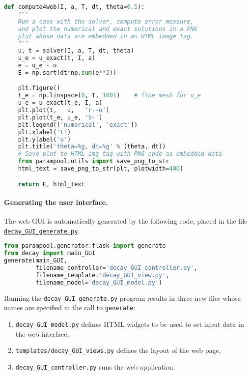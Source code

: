 \documentclass[graybox,sectrefs,envcountresetchap,open=right,final]{svmonodo}
\begin{document}
\begin{lstlisting}[language=python,style=blue1_bluegreen]
def compute4web(I, a, T, dt, theta=0.5):
    """
    Run a case with the solver, compute error measure,
    and plot the numerical and exact solutions in a PNG
    plot whose data are embedded in an HTML image tag.
    """
    u, t = solver(I, a, T, dt, theta)
    u_e = u_exact(t, I, a)
    e = u_e - u
    E = np.sqrt(dt*np.sum(e**2))

    plt.figure()
    t_e = np.linspace(0, T, 1001)    # fine mesh for u_e
    u_e = u_exact(t_e, I, a)
    plt.plot(t,   u,   'r--o')
    plt.plot(t_e, u_e, 'b-')
    plt.legend(['numerical', 'exact'])
    plt.xlabel('t')
    plt.ylabel('u')
    plt.title('theta=%g, dt=%g' % (theta, dt))
    # Save plot to HTML img tag with PNG code as embedded data
    from parampool.utils import save_png_to_str
    html_text = save_png_to_str(plt, plotwidth=400)

    return E, html_text

\end{lstlisting}


\paragraph{Generating the user interface.}
The web GUI is automatically generated by
the following code, placed in the file \href{{http://tinyurl.com/ofkw6kc/softeng/decay_GUI_generate.py}}{\nolinkurl{decay_GUI_generate.py}}.








\begin{lstlisting}[language=python,style=blue1bar_bluegreen]
from parampool.generator.flask import generate
from decay import main_GUI
generate(main_GUI,
         filename_controller='decay_GUI_controller.py',
         filename_template='decay_GUI_view.py',
         filename_model='decay_GUI_model.py')

\end{lstlisting}

Running the \Verb!decay_GUI_generate.py! program results in three new
files whose names are specified in the call to \texttt{generate}:

\begin{enumerate}
 \item \Verb!decay_GUI_model.py! defines HTML widgets to be used to set input data in the web interface,

 \item \Verb!templates/decay_GUI_views.py! defines the layout of the web page,

 \item \Verb!decay_GUI_controller.py! runs the web application.
\end{enumerate}
\end{document}
